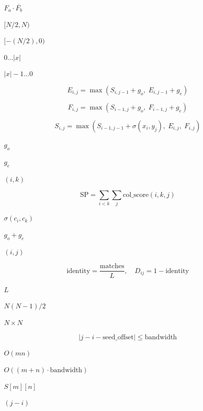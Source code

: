 \documentclass{article}
\begin{document}
$ F_a \cdot \overline{F_b}
$
\pagebreak

$ [N/2, N) $
\pagebreak

$ [-(N/2), 0) $
\pagebreak

$ 0 \ldots |x| $
\pagebreak

$ |x|-1 \ldots 0 $
\pagebreak

\[
  E_{i,j} = \max(S_{i,j-1} + g_o,\; E_{i,j-1} + g_e)
\]
\pagebreak

\[
  F_{i,j} = \max(S_{i-1,j} + g_o,\; F_{i-1,j} + g_e)
\]
\pagebreak

\[
  S_{i,j} = \max(S_{i-1,j-1} + \sigma(x_i, y_j),\; E_{i,j},\; F_{i,j})
\]
\pagebreak

$ g_o $
\pagebreak

$ g_e $
\pagebreak

$(i, k)$
\pagebreak

\[
  \text{SP} = \sum_{i < k} \sum_{j} \text{col\_score}(i, k, j)
\]
\pagebreak

$ \sigma(c_i, c_k) $
\pagebreak

$ g_o + g_e $
\pagebreak

$(i, j)$
\pagebreak

\[
  \text{identity} = \frac{\text{matches}}{L},\quad
  D_{ij} = 1 - \text{identity}
\]
\pagebreak

$ L $
\pagebreak

$ N(N-1)/2 $
\pagebreak

$ N \times N $
\pagebreak

\[
  |j - i - \text{seed\_offset}| \leq \text{bandwidth}
\]
\pagebreak

$ O(mn) $
\pagebreak

$ O((m+n) \cdot \text{bandwidth}) $
\pagebreak

$ S[m][n] $
\pagebreak

$(j - i)$
\pagebreak
\end{document}
